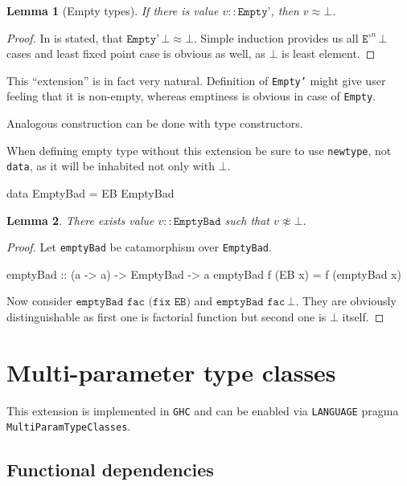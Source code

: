 \documentclass[11pt,oneside,draft]{fithesis2}
\newtheorem{lemma}{Lemma}
\begin{document}
\begin{lemma}[Empty types]
\label{emptyTypes}
If there is value \(v :: \texttt{Empty'}\), then \(v \approx \bot\).
\end{lemma}

\begin{proof}
In \cite{haskell2010} is stated, that \(\texttt{Empty'} \, \bot \approx \bot\).
Simple induction provides us all \(\texttt{E'}^n \, \bot\) cases
and least fixed point case is obvious as well, as \(\bot\) is least element.
\end{proof}

This ``extension'' is in fact very natural. Definition of \texttt{Empty'}
might give user feeling that it is non-empty, whereas emptiness is
obvious in case of \texttt{Empty}.

Analogous construction can be done with type constructors.

When defining empty type without this extension be sure to use
\texttt{newtype}, not \texttt{data}, as it will be inhabited not only with \(\bot\).
\begin{code}
data EmptyBad = EB EmptyBad
\end{code}

\begin{lemma}
There exists value \(v :: \texttt{EmptyBad}\) such that \(v \not \approx \bot\).
\end{lemma}

\begin{proof}
Let \texttt{emptyBad} be catamorphism over \texttt{EmptyBad}.
\begin{code}
emptyBad :: (a -> a) -> EmptyBad -> a
emptyBad f (EB x) = f (emptyBad x)
\end{code}
Now consider \(\texttt{emptyBad fac (fix EB)}\) and \(\texttt{emptyBad fac} \, \bot\).
They are obviously distinguishable as first one is factorial function but second one is \(\bot\) itself.
\end{proof}

\section{Multi-parameter type classes}

This extension is implemented in \texttt{GHC} and can be enabled via
\texttt{LANGUAGE} pragma \texttt{MultiParamTypeClasses}.

\subsection{Functional dependencies}
\end{document}
